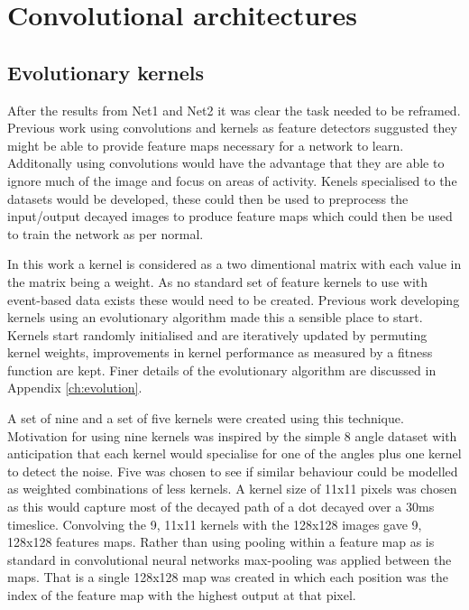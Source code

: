 \chapter{Convolutional architectures}
\label{ch:convolutions}

\section{Evolutionary kernels}
After the results from Net1 and Net2 it was clear the task needed to be reframed.
Previous work using convolutions and kernels as feature detectors suggusted they might be able to provide feature maps necessary for a network to learn.
Additonally using convolutions would have the advantage that they are able to ignore much of the image and focus on areas of activity.  
Kenels specialised to the datasets would be developed, these could then be used to preprocess the input/output decayed images to produce feature maps which could then be used to train the network as per normal.


In this work a kernel is considered as a two dimentional matrix with each value in the matrix being a weight.
As no standard set of feature kernels to use with event-based data exists these would need to be created.
Previous work developing kernels using an evolutionary algorithm made this a sensible place to start.
Kernels start randomly initialised and are iteratively updated by permuting kernel weights, improvements in kernel performance as measured by a fitness function are kept.
Finer details of the evolutionary algorithm are discussed in Appendix \ref{ch:evolution}.

A set of nine and a set of five kernels were created using this technique.
Motivation for using nine kernels was inspired by the simple 8 angle dataset with anticipation that each kernel would specialise for one of the angles plus one kernel to detect the noise.
Five was chosen to see if similar behaviour could be modelled as weighted combinations of less kernels.
A kernel size of 11x11 pixels was chosen as this would capture most of the decayed path of a dot decayed over a 30ms timeslice.
Convolving the 9, 11x11 kernels with the 128x128 images gave 9, 128x128 features maps.
Rather than using pooling within a feature map as is standard in convolutional neural networks max-pooling was applied between the maps. 
That is a single 128x128 map was created in which each position was the index of the feature map with the highest output at that pixel.

